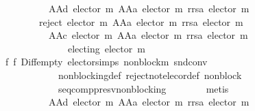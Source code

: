 \begin{isabellebody}
\ \ \ \ \ \ \ \ {\isacharbraceleft}{\kern0pt}{\isacharbraceright}{\kern0pt}\ {\isacharequal}{\kern0pt}\ AAd\ {\isacharparenleft}{\kern0pt}elector\ m\ {\isacharparenleft}{\kern0pt}AAa\ {\isacharparenleft}{\kern0pt}elector\ m{\isacharparenright}{\kern0pt}{\isacharparenright}{\kern0pt}\ {\isacharparenleft}{\kern0pt}rrsa\ {\isacharparenleft}{\kern0pt}elector\ m{\isacharparenright}{\kern0pt}{\isacharparenright}{\kern0pt}{\isacharparenright}{\kern0pt}\ {\isasymand}\isanewline
\ \ \ \ \ \ \ \ reject\ {\isacharparenleft}{\kern0pt}elector\ m{\isacharparenright}{\kern0pt}\ {\isacharparenleft}{\kern0pt}AAa\ {\isacharparenleft}{\kern0pt}elector\ m{\isacharparenright}{\kern0pt}{\isacharparenright}{\kern0pt}\ {\isacharparenleft}{\kern0pt}rrsa\ {\isacharparenleft}{\kern0pt}elector\ m{\isacharparenright}{\kern0pt}{\isacharparenright}{\kern0pt}\ {\isacharequal}{\kern0pt}\isanewline
\ \ \ \ \ \ \ \ \ \ AAc\ {\isacharparenleft}{\kern0pt}elector\ m\ {\isacharparenleft}{\kern0pt}AAa\ {\isacharparenleft}{\kern0pt}elector\ m{\isacharparenright}{\kern0pt}{\isacharparenright}{\kern0pt}\ {\isacharparenleft}{\kern0pt}rrsa\ {\isacharparenleft}{\kern0pt}elector\ m{\isacharparenright}{\kern0pt}{\isacharparenright}{\kern0pt}{\isacharparenright}{\kern0pt}\ {\isasymlongrightarrow}\isanewline
\ \ \ \ \ \ \ \ \ \ \ \ \ \ electing\ {\isacharparenleft}{\kern0pt}elector\ m{\isacharparenright}{\kern0pt}{\isachardoublequoteclose}\isanewline
\ \ \ \ \ \ \isamarkupfalse%
\ f{}\ f{}\ Diff{\isacharunderscore}{\kern0pt}empty\ elector{\isachardot}{\kern0pt}simps\ non{\isacharunderscore}{\kern0pt}block{\isacharunderscore}{\kern0pt}m\ snd{\isacharunderscore}{\kern0pt}conv\isanewline
\ \ \ \ \ \ \ \ \ \ \ \ non{\isacharunderscore}{\kern0pt}blocking{\isacharunderscore}{\kern0pt}def\ reject{\isacharunderscore}{\kern0pt}not{\isacharunderscore}{\kern0pt}elec{\isacharunderscore}{\kern0pt}or{\isacharunderscore}{\kern0pt}def\ non{\isacharunderscore}{\kern0pt}block\isanewline
\ \ \ \ \ \ \ \ \ \ \ \ seq{\isacharunderscore}{\kern0pt}comp{\isacharunderscore}{\kern0pt}presv{\isacharunderscore}{\kern0pt}non{\isacharunderscore}{\kern0pt}blocking\isanewline
\ \ \ \ \ \ \isamarkupfalse%
\ metis\isanewline
\ \ \ \ \isamarkupfalse%
\isanewline
\ \ \ \ \isacommand{{\isacharbraceleft}{\kern0pt}}\isamarkupfalse%
\isanewline
\ \ \ \ \ \ \isamarkupfalse%
\isanewline
\ \ \ \ \ \ \ \ {\isachardoublequoteopen}{\isacharbraceleft}{\kern0pt}{\isacharbraceright}{\kern0pt}\ {\isasymnoteq}\ AAd\ {\isacharparenleft}{\kern0pt}elector\ m\ {\isacharparenleft}{\kern0pt}AAa\ {\isacharparenleft}{\kern0pt}elector\ m{\isacharparenright}{\kern0pt}{\isacharparenright}{\kern0pt}\ {\isacharparenleft}{\kern0pt}rrsa\ {\isacharparenleft}{\kern0pt}elector\ m{\isacharparenright}{\kern0pt}{\isacharparenright}{\kern0pt}{\isacharparenright}{\kern0pt}{\isachardoublequoteclose}\isanewline

\end{isabellebody}

